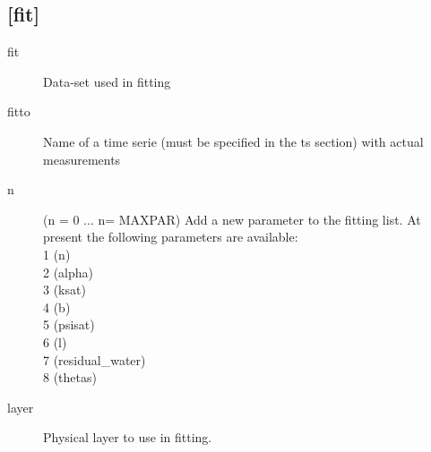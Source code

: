 \subsection{[fit]}\label{section:fit}
\begin{description}
\item[fit]
Data-set used in fitting

\item[fitto]
Name of a time serie (must be specified in the ts section) with
actual measurements

\item[n]
(n = 0 ... n= MAXPAR)
Add a new parameter to the fitting list.
At present the following
parameters are available:
\\
1 (n)
\\
2 (alpha)
\\
3 (ksat)
\\
4 (b)
\\
5 (psisat)
\\
6 (l)
\\
7 (residual\_water)
\\
8 (thetas)

\item[layer]
Physical layer to use in fitting.
\end{description}



